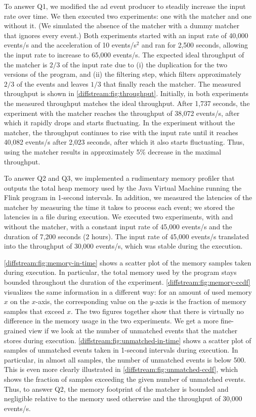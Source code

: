 To answer Q1, we modified the ad event producer to steadily increase
the input rate over time. We then executed two experiments: one with the
matcher and one without it. (We simulated the absence of the
matcher with a dummy matcher that ignores every event.) Both
experiments started with an input rate of 40,000 events/s and
the acceleration of 10 events/s$^2$ and ran for 2,500 seconds, allowing the
input rate to increase to 65,000 events/s. The expected ideal throughput of
the matcher is $2/3$ of the input rate due to (i) the duplication
for the two versions of the program, and (ii) the filtering step, which filters
approximately $2/3$ of the events and leaves $1/3$ that finally reach
the matcher. The measured throughput is shown in \cref{diffstream:fig:throughput}.
Initially, in both experiments the measured throughput matches the ideal
throughput. After 1,737 seconds, the experiment with the matcher reaches
the throughput of 38,072 events/s, after which it rapidly drops and starts
fluctuating. In the experiment without the matcher, the throughput continues
to rise with the input rate until it reaches 40,082 events/s after 2,023 seconds,
after which it also starts fluctuating. Thus, using the matcher results in
approximately 5\% decrease in the maximal throughput.

To answer Q2 and Q3, we implemented a rudimentary memory profiler
that outputs the total heap memory used by the Java Virtual Machine running
the Flink program in 1-second intervals. In addition, we measured the
latencies of the matcher by measuring the time it takes to process each
event; we stored the latencies in a file during execution. We executed
two experiments, with and without the matcher, with a constant input rate
of 45,000 events/s and the duration of 7,200 seconds (2 hours). The input
rate of 45,000 events/s translated into the throughput of 30,000 events/s,
which was stable during the execution.

\cref{diffstream:fig:memory-in-time} shows a scatter plot of the memory samples taken
during execution. In particular, the total memory used by the program
stays bounded throughout the duration of the experiment. \cref{diffstream:fig:memory-ccdf}
visualizes the same information in a different way: for an amount of used
memory $x$ on the $x$-axis, the corresponding value on the $y$-axis is
the fraction of memory samples that exceed $x$. The two figures together
show that there is virtually no difference in the memory usage in the two
experiments.
We get a more fine-grained view if we look at the number of unmatched events
that the matcher stores during execution. \cref{diffstream:fig:unmatched-in-time} shows
a scatter plot of samples of unmatched events taken in 1-second intervals
during execution. In particular, in almost all samples, the number of unmatched
events is below 500. This is even more clearly illustrated in
\cref{diffstream:fig:unmatched-ccdf}, which shows the fraction of samples exceeding
the given number of unmatched events. Thus, to answer Q2, the memory
footprint of the matcher is bounded and negligible relative to the memory
used otherwise and the throughput of 30,000 events/s.

